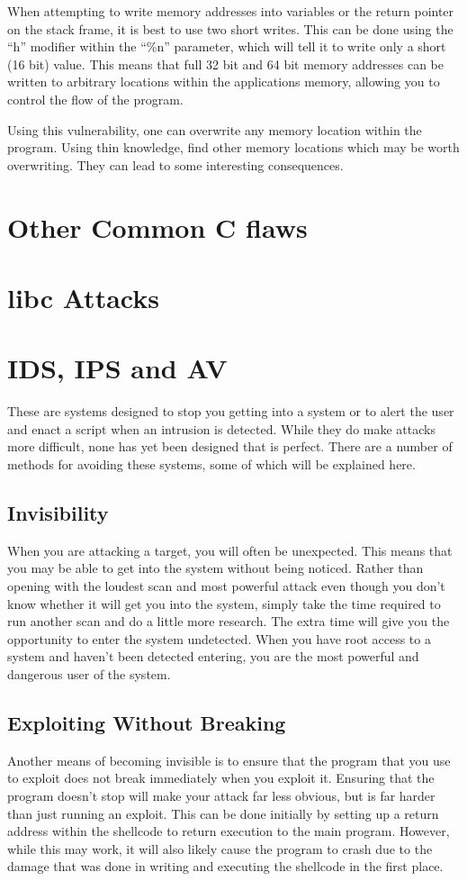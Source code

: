 \documentclass[a4paper,11pt]{report}
\begin{document}
			When attempting to write memory addresses into variables or the return pointer on the stack frame, it is best to use two short writes. 
			This can be done using the ``h'' modifier within the ``\%n'' parameter, which will tell it to write only a short (16 bit) value. 
			This means that full 32 bit and 64 bit memory addresses can be written to arbitrary locations within the applications memory, allowing you to control the flow of the program. 

			Using this vulnerability, one can overwrite any memory location within the program. 
			Using thin knowledge, find other memory locations which may be worth overwriting. 
			They can lead to some interesting consequences. 
	\section{Other Common C flaws}
	\section{libc Attacks}
	\section{IDS, IPS and AV}
		These are systems designed to stop you getting into a system or to alert the user and enact a script when an intrusion is detected. 
		While they do make attacks more difficult, none has yet been designed that is perfect. 
		There are a number of methods for avoiding these systems, some of which will be explained here. 

		\subsection{Invisibility}
			When you are attacking a target, you will often be unexpected. 
			This means that you may be able to get into the system without being noticed. 
			Rather than opening with the loudest scan and most powerful attack even though you don't know whether it will get you into the system,
			simply take the time required to run another scan and do a little more research. 
			The extra time will give you the opportunity to enter the system undetected. 
			When you have root access to a system and haven't been detected entering, you are the most powerful and dangerous user of the system. 

		\subsection{Exploiting Without Breaking}
			Another means of becoming invisible is to ensure that the program that you use to exploit does not break immediately when you exploit it. 
			Ensuring that the program doesn't stop will make your attack far less obvious, but is far harder than just running an exploit. 
			This can be done initially by setting up a return address within the shellcode to return execution to the main program. 
			However, while this may work, it will also likely cause the program to crash due to the damage that was done in writing and executing the shellcode in the first place. 
			
\end{document}
